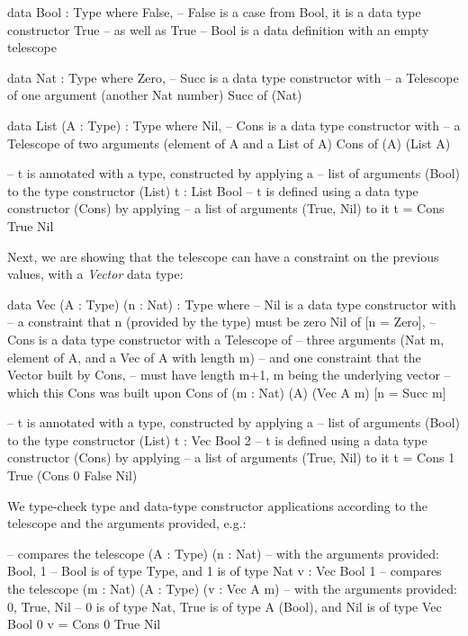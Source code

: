\documentclass[12pt]{article}
\theoremstyle{definition}
\begin{document}
\begin{piforall}
data Bool : Type where {
       False,  -- False is a case from Bool, it is a data type constructor
       True    -- as well as True
} -- Bool is a data definition with an empty telescope

data Nat : Type where {
       Zero,
       -- Succ is a data type constructor with
       -- a Telescope of one argument (another Nat number)
       Succ of (Nat)
}

data List (A : Type) : Type where {
       Nil,
       -- Cons is a data type constructor with
       -- a Telescope of two arguments (element of A and a List of A)
       Cons of (A) (List A)
}

-- t is annotated with a type, constructed by applying a
-- list of arguments (Bool) to the type constructor (List)
t : List Bool
-- t is defined using a data type constructor (Cons) by applying
-- a list of arguments (True, Nil) to it
t = Cons True Nil
\end{piforall}

Next, we are showing that the telescope can have a constraint on the previous values, with a \emph{Vector} data type:

\begin{piforall}
data Vec (A : Type) (n : Nat) : Type where {
  -- Nil is a data type constructor with
  -- a constraint that n (provided by the type) must be zero
  Nil of [n = Zero],
  -- Cons is a data type constructor with a Telescope of 
  -- three arguments (Nat m, element of A, and a Vec of A with length m)
  -- and one constraint that the Vector built by Cons,
  -- must have length m+1, m being the underlying vector
  -- which this Cons was built upon
  Cons of (m : Nat) (A) (Vec A m) [n = Succ m]
}

-- t is annotated with a type, constructed by applying a
-- list of arguments (Bool) to the type constructor (List)
t : Vec Bool 2
-- t is defined using a data type constructor (Cons) by applying
-- a list of arguments (True, Nil) to it
t = Cons 1 True (Cons 0 False Nil)
\end{piforall}

We type-check type and data-type constructor applications according to the telescope and the arguments provided, e.g.:

\begin{piforall}
-- compares the telescope (A : Type) (n : Nat)
-- with the arguments provided: Bool, 1
-- Bool is of type Type, and 1 is of type Nat
v : Vec Bool 1
-- compares the telescope (m : Nat) (A : Type) (v : Vec A m)
-- with the arguments provided: 0, True, Nil
-- 0 is of type Nat, True is of type A (Bool), and Nil is of type Vec Bool 0
v = Cons 0 True Nil
\end{piforall}
\end{document}
